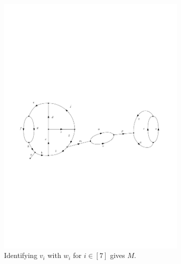 \begin{figure}
\begin{subfigure}{.8\textwidth}
  \includegraphics[width=0.9\linewidth]{Content/Pictures/identification.pdf}
  \caption{Identifying $v_i$ with $w_i$ for $i\in [7]$ gives $M$.}
  \label{figure.extractSCCs2}
\end{subfigure}\\
\vspace{1.5em}
\begin{subfigure}{.8\textwidth}
  \centering

\end{subfigure}
\end{figure}
